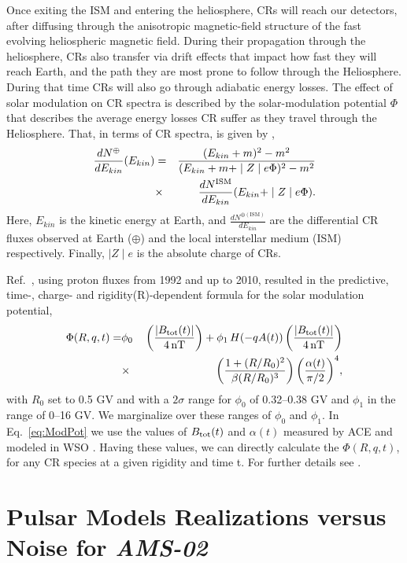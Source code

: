 \documentclass[aps,prd,twocolumn,amsmath,superscriptaddress,amssymb,showpacs,floatfix,nofootinbib]{revtex4-1}
\begin{document}
\begin{appendix}
Once exiting the ISM and entering the heliosphere, CRs will
reach our detectors, after diffusing through the anisotropic
magnetic-field structure of the fast evolving heliospheric
magnetic field. During their propagation through the heliosphere,
CRs also transfer via 
drift effects that impact how fast they will reach Earth, and the path they 
are most prone to follow through
the Heliosphere. During that time CRs will also go through adiabatic energy losses. 
The effect of solar modulation on CR spectra is described by the
solar-modulation potential $\Phi$
that describes the average energy losses CR suffer 
as they travel through the Heliosphere. That, in terms of CR spectra, is 
given by \cite{1968ApJ...154.1011G},
\begin{eqnarray}
\frac{dN^{\oplus}}{dE_{kin}} (E_{kin}) &=& \frac{(E_{kin}+m)^{2} -m^{2}}{(E_{kin}+m+\mid Z\mid e \Phi)^{2} -m^2} \nonumber \\ 
&\times&\; \frac{dN^{\rm ISM}}{dE_{kin}} (E_{kin}+\mid Z\mid e \Phi).
\label{eq:SolMod}
\end{eqnarray}
Here, $E_{kin}$ is the kinetic energy at Earth, and 
$\frac{dN^{\oplus (\textrm{ISM})}}{dE_{kin}}$ are the
differential CR fluxes observed at Earth ($\oplus$) and the
local interstellar medium (ISM) respectively. Finally, $\mid Z
\mid e$  is the absolute charge of CRs.

Ref.~\cite{Cholis:2015gna}, using proton fluxes from 1992 and up to 2010, resulted in the predictive, time-, charge- and rigidity(R)-dependent formula for the solar modulation potential,
 \begin{eqnarray}
\Phi(R,q,t) = &\phi_{0}& \, \bigg( \frac{|B_{\rm tot}(t)|}{4\, {\rm nT}}\bigg) + \phi_{1} \, H(-qA(t))\, \bigg( \frac{|B_{\rm tot}(t)|}{4\,  {\rm nT}}\bigg) \nonumber \\
&\times& \,\bigg(\frac{1+(R/R_0)^2}{\beta (R/R_{0})^3}\bigg) \, \bigg( \frac{\alpha(t)}{\pi/2} \bigg)^{4},
\label{eq:ModPot}
\end{eqnarray}
with $R_{0}$ set to 0.5 GV and with a $2\sigma$ range for $
\phi_{0}$ of 0.32--0.38 GV and $ \phi_{1}$ in the 
range of 0--16 GV. 
We marginalize over these ranges of $ \phi_{0}$ and $ \phi_{1}$.
In Eq.~\ref{eq:ModPot} we use the values of $B_{\rm tot}(t)$ and
$\alpha(t)$ measured by ACE \cite{ACESite} and modeled in WSO
\cite{WSOSite}. Having these values, we can directly calculate
the $\Phi(R,q,t)$, for any CR species at a given rigidity and
time t. For further details see \cite{Cholis:2015gna}. 

\section{Pulsar Models Realizations versus Noise for \textit{AMS-02}}
\label{appE}


\end{appendix}
\end{document}

